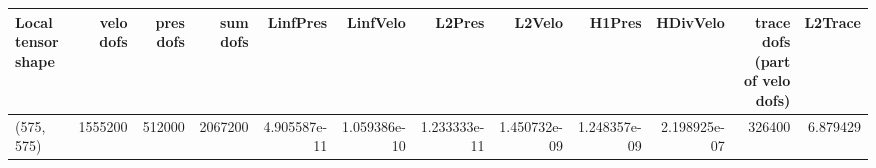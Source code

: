\begin{tabular}{lrrrrrrrrrrr}
\toprule
Local tensor shape &  velo dofs &  pres dofs &  sum dofs &     LinfPres &     LinfVelo &       L2Pres &       L2Velo &       H1Pres &     HDivVelo &  trace dofs (part of velo dofs) &  L2Trace \\
\midrule
        (575, 575) &    1555200 &     512000 &   2067200 & 4.905587e-11 & 1.059386e-10 & 1.233333e-11 & 1.450732e-09 & 1.248357e-09 & 2.198925e-07 &                          326400 & 6.879429 \\
\bottomrule
\end{tabular}
